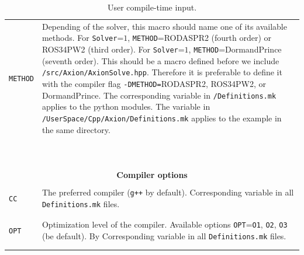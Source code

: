 \documentclass[11pt,a4paper]{article}
\begin{document}
\begin{table}[h!]
\begin{tabular}{l l}
		{\tt METHOD}& \multirow{1}{12cm}{Depending of the solver, this macro should name one of its available methods. 
		For {\tt Solver}=$1$, {\tt METHOD}=RODASPR2 (fourth order) or ROS34PW2 (third order). 	
		For {\tt Solver}=$1$, {\tt METHOD}=DormandPrince (seventh order). This should be a macro defined before we include {\tt \mimes/src/Axion/AxionSolve.hpp}. Therefore it is preferable to 
		define it with the compiler flag {\tt -DMETHOD=}RODASPR2, ROS34PW2, or DormandPrince.
		The corresponding variable in {\tt \mimes/Definitions.mk} applies to the python modules. The variable in {\tt \mimes/UserSpace/Cpp/Axion/Definitions.mk} applies to the example in the same directory.}\\\\\\\\\\\\\\\\\\\\ 		
		\hline\\[-0.4cm]
		
		\multicolumn{2}{c}{\bf Compiler options}  \\
		\hline\\[-0.4cm]
		
		{\tt CC} &  \multirow{1}{12cm}{The preferred \CPP compiler ({\tt g++} by default). Corresponding variable in all {\tt Definitions.mk} files.} \\\\
		\hline\\[-0.4cm]
		
		{\tt OPT} &  \multirow{1}{12cm}{Optimization level of the compiler. Available options {\tt OPT}={\tt O1}, {\tt O2}, {\tt O3} (be default). By Corresponding variable in all {\tt Definitions.mk} files.}   \\\\
		\hline\\[-0.4cm]

	\end{tabular}
	\caption{User compile-time input.}
	\label{tab:compile_time-input}
\end{table}



\newpage
{}
                        
\end{document}
